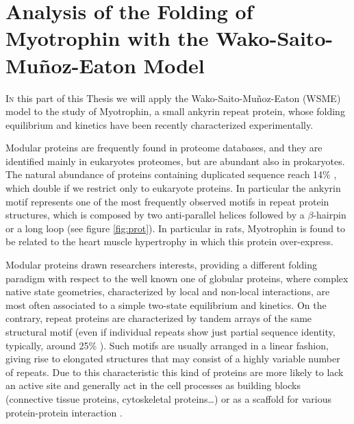 \part[Analysis of the Folding of Myotrophin with a Simple Model]
{Analysis of the Folding of Myotrophin with the Wako-Saito-Mu{\~n}oz-Eaton Model
}

\thispagestyle{plain}

\lettrine{I}{n} this part of this Thesis we will 
apply the Wako-Saito-Mu{\~n}oz-Eaton (WSME) model to the study
of Myotrophin, a small ankyrin repeat protein, whose folding 
equilibrium and kinetics  have been recently characterized experimentally. 

Modular proteins are frequently found in proteome databases, and they are
identified mainly in eukaryotes proteomes, but are abundant also in prokaryotes. The natural abundance of proteins
containing duplicated sequence reach 14\% \cite{marcotte1999}, 
which double if we restrict only to eukaryote proteins.
In particular the ankyrin motif represents one of the most frequently observed motifs 
in repeat protein structures, which is composed by two anti-parallel helices
followed by a $\beta$-hairpin or a long loop (see figure \ref{fig:prot}).
In particular in rats, Myotrophin is found to be related to the heart muscle
hypertrophy in which this protein over-express.

Modular proteins drawn researchers interests, providing a different folding
paradigm with respect to the well known
one of globular proteins, where complex native state geometries, 
characterized by local and non-local interactions, are most often associated 
to a simple two-state equilibrium and kinetics.
On the contrary, repeat proteins are characterized by tandem arrays 
of the same structural motif (even if individual repeats show just 
partial sequence identity, typically, around 25\% \cite{Kloss2008}). 
Such motifs are usually arranged in a linear fashion, giving rise to elongated 
structures that may consist of a highly variable number of repeats. 
Due to this characteristic this kind of proteins are more likely to lack  an
active site and generally act in the cell processes as building blocks
(connective tissue proteins, cytoskeletal proteins\dots) \cite{marcotte1999} or
 as a scaffold for various protein-protein interaction \cite{Mosavi2004}.

